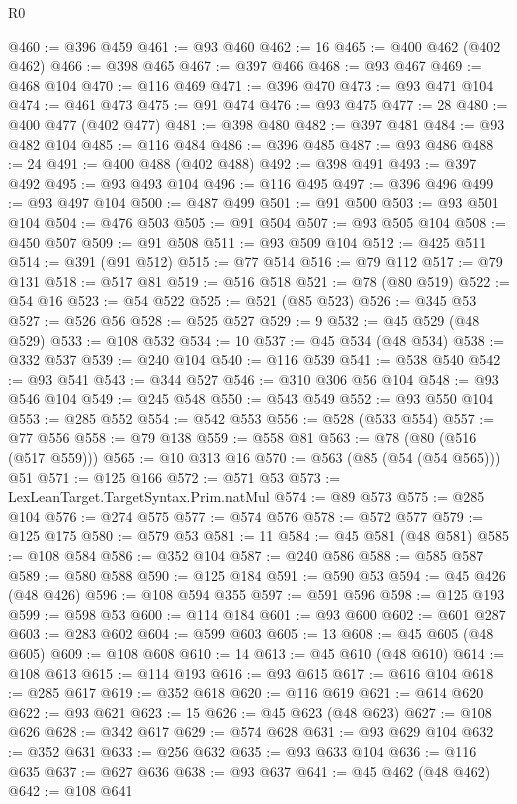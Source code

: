 \begin{lexlean}{R0}
\begin{coremodule}
@460 := @396 @459
@461 := @93 @460
@462 := 16
@465 := @400 @462 (@402 @462)
@466 := @398 @465
@467 := @397 @466
@468 := @93 @467
@469 := @468 @104
@470 := @116 @469
@471 := @396 @470
@473 := @93 @471 @104
@474 := @461 @473
@475 := @91 @474
@476 := @93 @475
@477 := 28
@480 := @400 @477 (@402 @477)
@481 := @398 @480
@482 := @397 @481
@484 := @93 @482 @104
@485 := @116 @484
@486 := @396 @485
@487 := @93 @486
@488 := 24
@491 := @400 @488 (@402 @488)
@492 := @398 @491
@493 := @397 @492
@495 := @93 @493 @104
@496 := @116 @495
@497 := @396 @496
@499 := @93 @497 @104
@500 := @487 @499
@501 := @91 @500
@503 := @93 @501 @104
@504 := @476 @503
@505 := @91 @504
@507 := @93 @505 @104
@508 := @450 @507
@509 := @91 @508
@511 := @93 @509 @104
@512 := @425 @511
@514 := @391 (@91 @512)
@515 := @77 @514
@516 := @79 @112
@517 := @79 @131
@518 := @517 @81
@519 := @516 @518
@521 := @78 (@80 @519)
@522 := @54 @16
@523 := @54 @522
@525 := @521 (@85 @523)
@526 := @345 @53
@527 := @526 @56
@528 := @525 @527
@529 := 9
@532 := @45 @529 (@48 @529)
@533 := @108 @532
@534 := 10
@537 := @45 @534 (@48 @534)
@538 := @332 @537
@539 := @240 @104
@540 := @116 @539
@541 := @538 @540
@542 := @93 @541
@543 := @344 @527
@546 := @310 @306 @56 @104
@548 := @93 @546 @104
@549 := @245 @548
@550 := @543 @549
@552 := @93 @550 @104
@553 := @285 @552
@554 := @542 @553
@556 := @528 (@533 @554)
@557 := @77 @556
@558 := @79 @138
@559 := @558 @81
@563 := @78 (@80 (@516 (@517 @559)))
@565 := @10 @313 @16
@570 := @563 (@85 (@54 (@54 @565))) @51
@571 := @125 @166
@572 := @571 @53
@573 := LexLeanTarget.TargetSyntax.Prim.natMul
@574 := @89 @573
@575 := @285 @104
@576 := @274 @575
@577 := @574 @576
@578 := @572 @577
@579 := @125 @175
@580 := @579 @53
@581 := 11
@584 := @45 @581 (@48 @581)
@585 := @108 @584
@586 := @352 @104
@587 := @240 @586
@588 := @585 @587
@589 := @580 @588
@590 := @125 @184
@591 := @590 @53
@594 := @45 @426 (@48 @426)
@596 := @108 @594 @355
@597 := @591 @596
@598 := @125 @193
@599 := @598 @53
@600 := @114 @184
@601 := @93 @600
@602 := @601 @287
@603 := @283 @602
@604 := @599 @603
@605 := 13
@608 := @45 @605 (@48 @605)
@609 := @108 @608
@610 := 14
@613 := @45 @610 (@48 @610)
@614 := @108 @613
@615 := @114 @193
@616 := @93 @615
@617 := @616 @104
@618 := @285 @617
@619 := @352 @618
@620 := @116 @619
@621 := @614 @620
@622 := @93 @621
@623 := 15
@626 := @45 @623 (@48 @623)
@627 := @108 @626
@628 := @342 @617
@629 := @574 @628
@631 := @93 @629 @104
@632 := @352 @631
@633 := @256 @632
@635 := @93 @633 @104
@636 := @116 @635
@637 := @627 @636
@638 := @93 @637
@641 := @45 @462 (@48 @462)
@642 := @108 @641

\end{coremodule}
\end{lexlean}
